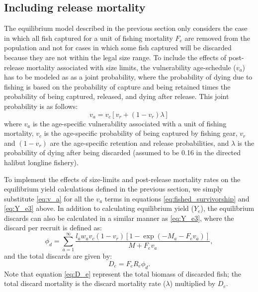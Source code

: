 \documentclass[12pt,leqno]{article}
\begin{document}
\subsection*{Including release mortality} %
\label{sub:including_release_mortality}
The equilibrium model described in the previous section only considers the case in which all fish captured for a unit of fishing mortality $F_e$ are removed from the population and not for cases in which some fish captured will be discarded because they are not within the legal size range.  To include the effects of post-release mortality associated with size limits, the vulnerability age-schedule ($v_a$) has to be modeled as as a joint probability, where the probability of dying due to fishing is based on the probability of capture and being retained times the probability of being captured, released, and dying after release.  This joint probability is as follows:
\begin{equation} \label{eq:v_a}
	v_a = v_c[v_r + (1-v_r)\lambda]
\end{equation}
where $v_a$ is the age-specific vulnerability associated with a unit of fishing mortality, $v_c$ is the age-specific probability of being captured by fishing gear, $v_r$ and $(1-v_r)$ are the age-specific retention and release probabilities, and $\lambda$ is the probability of dying after being discarded (assumed to be 0.16 in the directed halibut longline fishery).

To implement the effects of size-limits and post-release mortality rates on the equilibrium yield calculations defined in the previous section, we simply substitute \eqref{eq:v_a} for all the $v_a$ terms in equations \ref{eq:fished_survivorship} and \ref{eq:Y_e3} above.  In addition to calculating equilibrium yield ($Y_e$), the equilibrium discards can also be calculated in a similar manner as \eqref{eq:Y_e3}, where the discard per recruit is defined as:
\begin{equation}\label{eq:phi_d}
	\phi_d = \sum_{a=1}^\infty \frac{l_a w_a v_c(1-v_r) [1-\exp(-M_a-F_e v_a)]}{M+F_e v_a},
\end{equation}
and the total discards are given by:
\begin{equation}\label{eq:D_e}
	D_e = F_e R_e \phi_d.
\end{equation}
Note that equation \ref{eq:D_e} represent the total biomass of discarded fish; the total discard mortality is  the discard mortality rate ($\lambda$) multiplied by $D_e$.
\end{document}
